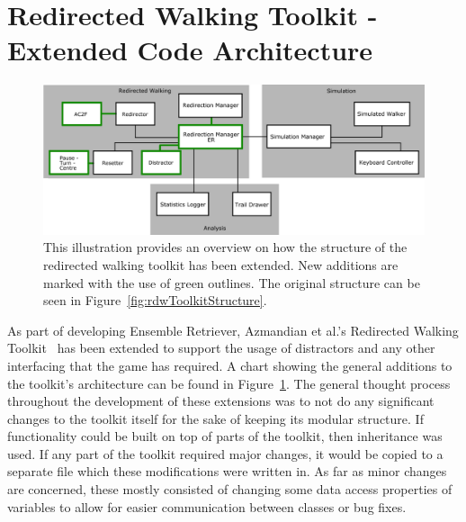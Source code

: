 \section{Redirected Walking Toolkit - Extended Code Architecture}\label{sec:extendedRDWToolkitArchitecture}
\begin{figure}[tbph]
    \centering
    \includegraphics[width=1.0\textwidth]{figures/graphs/ToolkitExtension.png}
    \caption[Extended Structure of the Redirected Walking Toolkit]{This illustration provides an overview on how the structure of the redirected walking toolkit has been extended. New additions are marked with the use of green outlines. The original structure can be seen in Figure~\ref{fig:rdwToolkitStructure}.}
    \label{fig:rdwToolkitExtendedStructure}
\end{figure}

As part of developing Ensemble Retriever, Azmandian et al.'s Redirected Walking Toolkit~\cite{azmandian2016redirected} has been extended to support the usage of distractors and any other interfacing that the game has required. A chart showing the general additions to the toolkit's architecture can be found in Figure~\ref{fig:rdwToolkitExtendedStructure}. The general thought process throughout the development of these extensions was to not do any significant changes to the toolkit itself for the sake of keeping its modular structure. If functionality could be built on top of parts of the toolkit, then inheritance was used. If any part of the toolkit required major changes, it would be copied to a separate file which these modifications were written in. As far as minor changes are concerned, these mostly consisted of changing some data access properties of variables to allow for easier communication between classes or bug fixes.

